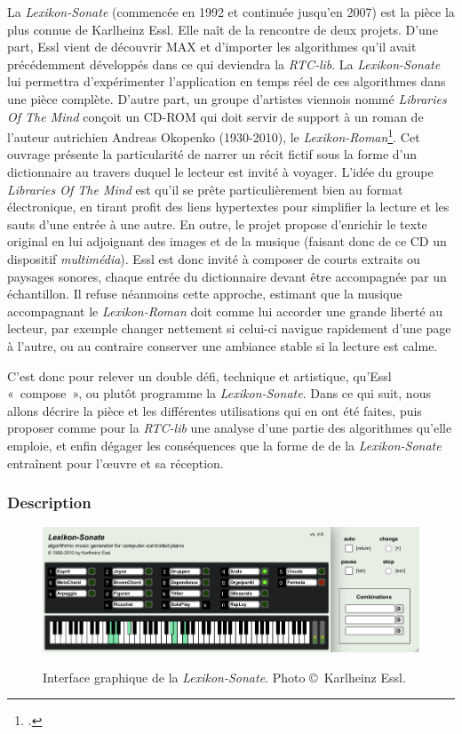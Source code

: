 \documentclass[a4paper,12pt]{article}
\newcommand{\guill}[1]{«~#1~»}
\begin{document}
La \emph{Lexikon-Sonate} (commencée en 1992 et continuée jusqu'en 2007) est la pièce la plus connue de Karlheinz Essl. Elle naît de la rencontre de deux projets. D'une part, Essl vient de découvrir MAX et d'importer les algorithmes qu'il avait précédemment développés dans ce qui deviendra la \emph{RTC-lib}. La \emph{Lexikon-Sonate} lui permettra d'expérimenter l'application en temps réel de ces algorithmes dans une pièce complète. D'autre part, un groupe d'artistes viennois nommé \emph{Libraries Of The Mind} conçoit un CD-ROM qui doit servir de support à un roman de l'auteur autrichien Andreas Okopenko (1930-2010), le \emph{Lexikon-Roman}\footnote{\cite{okopenko1983lexikon}.}. Cet ouvrage présente la particularité de narrer un récit fictif sous la forme d'un dictionnaire au travers duquel le lecteur est invité à voyager. L'idée du groupe \emph{Libraries Of The Mind} est qu'il se prête particulièrement bien au format électronique, en tirant profit des liens hypertextes pour simplifier la lecture et les sauts d'une entrée à une autre. En outre, le projet propose d'enrichir le texte original en lui adjoignant des images et de la musique (faisant donc de ce CD un dispositif \emph{multimédia}). Essl est donc invité à composer de courts extraits ou paysages sonores, chaque entrée du dictionnaire devant être accompagnée par un échantillon. Il refuse néanmoins cette approche, estimant que la musique accompagnant le \emph{Lexikon-Roman} doit comme lui accorder une grande liberté au lecteur, par exemple changer nettement si celui-ci navigue rapidement d'une page à l'autre, ou au contraire conserver une ambiance stable si la lecture est calme.

C'est donc pour relever un double défi, technique et artistique, qu'Essl \guill{compose}, ou plutôt programme la \emph{Lexikon-Sonate}. Dans ce qui suit, nous allons décrire la pièce et les différentes utilisations qui en ont été faites, puis proposer comme pour la \emph{RTC-lib} une analyse d'une partie des algorithmes qu'elle emploie, et enfin dégager les conséquences que la forme de de la \emph{Lexikon-Sonate} entraînent pour l'œuvre et sa réception.

\subsubsection{Description}

\begin{figure}[h!]
\begin{center}
\includegraphics[width=\textwidth]{images/lexson.png}
\label{lsinterface}
\caption{Interface graphique de la \emph{Lexikon-Sonate}. Photo \copyright~Karlheinz Essl.} %
\end{center}
\end{figure}
\end{document}
